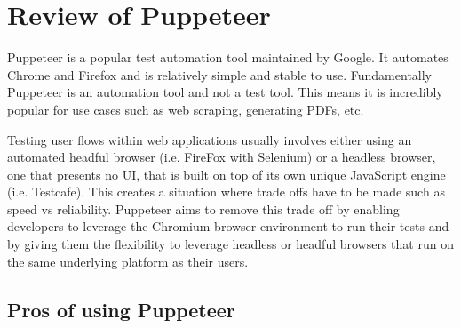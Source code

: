 \documentclass[12pt,a4paper,titlepage]{report}
\begin{document}
\section{Review of Puppeteer}

Puppeteer is a popular test automation tool maintained by Google. It automates Chrome and Firefox and is relatively simple and stable to use.
Fundamentally Puppeteer is an automation tool and not a test tool. 
This means it is incredibly popular for use cases such as web scraping, generating PDFs, etc. \autocite{PuppvsSel}

Testing user flows within web applications usually involves either using an automated headful
browser (i.e. FireFox with Selenium) or a headless browser, one that presents no UI, that is built on top of its own unique JavaScript
engine (i.e. Testcafe). This creates a situation where trade offs have to be made such as speed vs reliability.
Puppeteer aims to remove this trade off by enabling developers to leverage the Chromium browser environment
to run their tests and by giving them the flexibility to leverage headless or headful browsers that run on the same underlying platform as their users. \autocite{Crowther}

\subsection{Pros of using Puppeteer}
\end{document}
